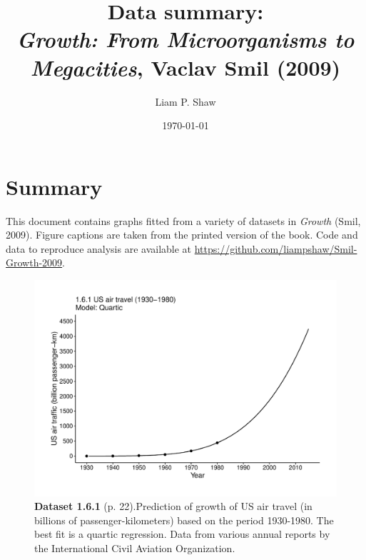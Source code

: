 \documentclass[aps,rmp,preprint,superscriptaddress,10pt,onecolumn]{article}
\begin{document}
\title{Data summary:\\\textit{Growth: From Microorganisms to Megacities}, Vaclav Smil (2009)}
\author{Liam P. Shaw}
\date{\today}


\maketitle

\section*{Summary}

\noindent This document contains graphs fitted from a variety of datasets in \textit{Growth} (Smil, 2009). Figure captions are taken from the printed version of the book. Code and data to reproduce analysis are available at \url{https://github.com/liampshaw/Smil-Growth-2009}. 
\clearpage
\begin{figure}[h]
\includegraphics[width=\textwidth]{output/figs-ggplot/1.6.1.pdf}
\caption*{\textbf{Dataset 1.6.1} (p. 22).Prediction of growth of US air travel (in billions of passenger-kilometers) based on the period 1930-1980. The best fit is a quartic regression. Data from various annual reports by the International Civil Aviation Organization. }
\end{figure}
	
\end{document}

